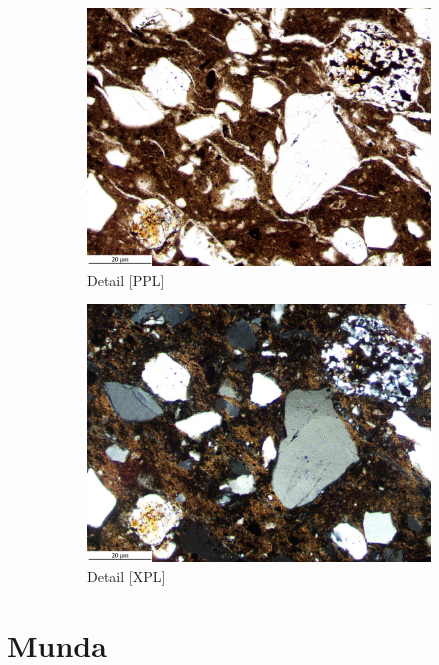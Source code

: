 \documentclass[a4paper]{article}
\begin{document}
\begin{figure}[H]
\begin{subfigure}[t]{.49\textwidth}
		\includegraphics[width=\textwidth]{ThinSections/57-6_10x_PPL.jpg}
		\caption{Detail [PPL]}
	\end{subfigure}\hspace{.5em}\hfill
	\begin{subfigure}[t]{.49\textwidth}
		\includegraphics[width=\textwidth]{ThinSections/57-6_10x_XPL.jpg}
		\caption{Detail [XPL]}
	\end{subfigure}
	\caption{}
	\label{fig:57_pik}
\end{figure}

\newpage\section{Munda}
\end{document}

